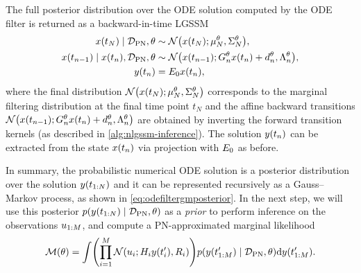 \documentclass{mimosis}
\begin{document}
The full posterior distribution over the ODE solution computed by the ODE filter is returned as a backward-in-time LGSSM
\begin{subequations}
\label{eq:odefiltergmposterior}
\begin{align}
  \st(t_N) \mid \data_\text{PN}, \theta &\sim \N( \st(t_N); \mean{N}^\theta, \cov{N}^\theta ), \\
  \st(t_{n-1}) \mid \st(t_n), \data_\text{PN}, \theta &\sim \N( \st(t_{n-1}); \invtransA_n^\theta \st(t_n) + \invtransb_n^\theta, \invtransC_n^\theta ), \\
  \val(t_n) &= \proj{0} \st(t_n),
\end{align}
\end{subequations}
where the final distribution \(\N( \st(t_N); \mean{N}^\theta, \cov{N}^\theta )\) corresponds to the marginal filtering distribution at the final time point \(t_N\)
and the affine backward transitions \(\N( \st(t_{n-1}); \invtransA_n^\theta \st(t_n) + \invtransb_n^\theta, \invtransC_n^\theta )\) are obtained by inverting the forward transition kernels (as described in \cref{alg:nlgssm-inference}).
The solution \(y(t_n)\) can be extracted from the state \(x(t_n)\) via projection with \(E_{0}\) as before.

In summary, the probabilistic numerical ODE solution is a posterior distribution over the solution \(y(t_{1:N})\) and it can be represented recursively as a Gauss--Markov process, as shown in \cref{eq:odefiltergmposterior}.
In the next step, we will use this posterior
\(\p(\val(t_{1:N})\mid\data_\text{PN},\theta)\)
as a \emph{prior} to perform inference on the observations \(u_{1:M}\), and compute a PN-approximated marginal likelihood
\begin{equation}
  \label{eq:fenrir:marginallikelihood:pn1}
  \mathcal{M}(\theta) = \int
    \left( \prod_{i=1}^M \N( \oobs_i; \obsA_i \val \left(t_i'\right), \obsC_i ) \right)
    \p(\val(t_{1:M}') \mid \data_\text{PN},\theta)
  \dd \val(t_{1:M}').
\end{equation}
\end{document}
